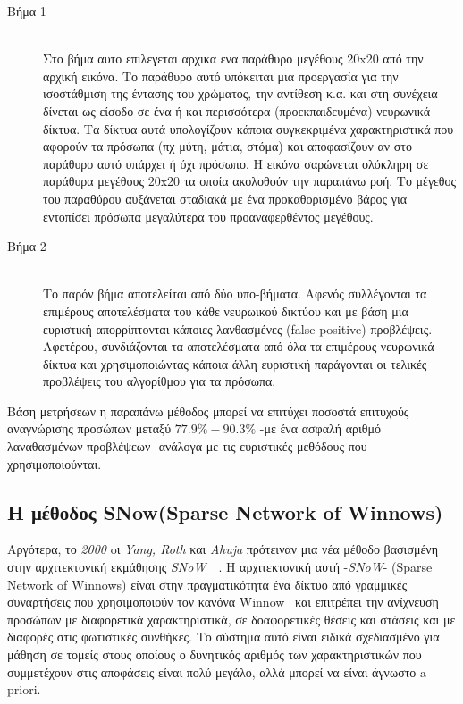 \begin{description}\label{item:rowley}
  \item[Βήμα 1] \hfill \\
    Στο βήμα αυτο επιλεγεται αρχικα ενα παράθυρο μεγέθους 20x20 από την αρχική εικόνα.
    Το παράθυρο αυτό υπόκειται μια προεργασία για την ισοστάθμιση της έντασης του
    χρώματος, την αντίθεση κ.α. και στη συνέχεια δίνεται ως είσοδο σε ένα ή και
    περισσότερα (προεκπαιδευμένα) νευρωνικά δίκτυα. Τα δίκτυα αυτά υπολογίζουν κάποια
    συγκεκριμένα χαρακτηριστικά που αφορούν τα πρόσωπα (πχ μύτη, μάτια, στόμα) και
    αποφασίζουν αν στο παράθυρο αυτό υπάρχει ή όχι πρόσωπο. Η εικόνα σαρώνεται
    ολόκληρη σε παράθυρα μεγέθους 20x20 τα οποία ακολοθούν την παραπάνω ροή.
    Το μέγεθος του παραθύρου αυξάνεται σταδιακά με ένα προκαθορισμένο βάρος για
    εντοπίσει πρόσωπα μεγαλύτερα του προαναφερθέντος μεγέθους.
  \item[Βήμα 2] \hfill \\
    Το παρόν βήμα αποτελείται από δύο υπο-βήματα. Αφενός συλλέγονται τα επιμέρους
    αποτελέσματα του κάθε νευρωικού δικτύου και με βάση μια ευριστική απορρίπτονται
    κάποιες λανθασμένες (false positive) προβλέψεις. Αφετέρου, συνδιάζονται τα
    αποτελέσματα από όλα τα επιμέρους νευρωνικά δίκτυα και χρησιμοποιώντας κάποια
    άλλη ευριστική παράγονται οι τελικές προβλέψεις του αλγορίθμου για τα πρόσωπα.
\end{description}

Βάση μετρήσεων η παραπάνω μέθοδος μπορεί να επιτύχει ποσοστά επιτυχούς αναγνώρισης
προσώπων μεταξύ $77.9\% - 90.3\%$ -με ένα ασφαλή αριθμό λαναθασμένων προβλέψεων-
ανάλογα με τις ευριστικές μεθόδους που χρησιμοποιούνται.

\subsection{H μέθοδος SNow(Sparse Network of Winnows)~\cite{Yang00asnow-based}}

Αργότερα, το \emph{2000} oι \emph{Yang, Roth} και \emph{Ahuja} πρότειναν μια νέα
μέθοδο βασισμένη στην αρχιτεκτονική εκμάθησης \emph{SNoW}~\cite{Roth98learningto}~\cite{CCRR99}.
Η αρχιτεκτονική αυτή -\emph{SNoW}- (Sparse Network of Winnows)
είναι στην πραγματικότητα ένα δίκτυο από γραμμικές συναρτήσεις που χρησιμοποιούν
τον κανόνα Winnow~\cite{Littlestone:1988:LQI:639961.639994} και επιτρέπει την
ανίχνευση προσώπων με διαφορετικά χαρακτηριστικά, σε δοαφορετικές θέσεις και
στάσεις και με διαφορές στις φωτιστικές συνθήκες. Το σύστημα αυτό είναι ειδικά
σχεδιασμένο για μάθηση σε τομείς στους οποίους ο δυνητικός αριθμός των
χαρακτηριστικών που συμμετέχουν στις αποφάσεις είναι πολύ μεγάλο, αλλά μπορεί να
είναι άγνωστο a priori.

